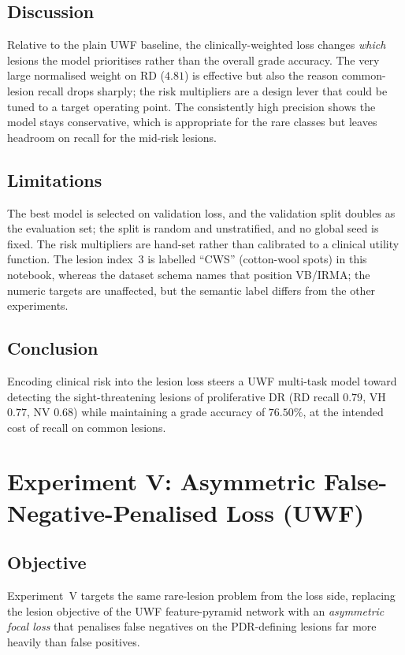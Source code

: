 \documentclass[journal,twoside,web]{ieeecolor}
\begin{document}
\subsection{Discussion}
Relative to the plain UWF baseline, the clinically-weighted loss changes
\emph{which} lesions the model prioritises rather than the overall grade accuracy.
The very large normalised weight on RD ($4.81$) is effective but also the reason
common-lesion recall drops sharply; the risk multipliers are a design lever that
could be tuned to a target operating point. The consistently high precision shows
the model stays conservative, which is appropriate for the rare classes but leaves
headroom on recall for the mid-risk lesions.

\subsection{Limitations}
The best model is selected on validation loss, and the validation split doubles as
the evaluation set; the split is random and unstratified, and no global seed is
fixed. The risk multipliers are hand-set rather than calibrated to a clinical
utility function. The lesion index~$3$ is labelled ``CWS'' (cotton-wool spots) in
this notebook, whereas the dataset schema names that position VB/IRMA; the numeric
targets are unaffected, but the semantic label differs from the other experiments.

\subsection{Conclusion}
Encoding clinical risk into the lesion loss steers a UWF multi-task model toward
detecting the sight-threatening lesions of proliferative DR (RD recall $0.79$,
VH $0.77$, NV $0.68$) while maintaining a grade accuracy of $76.50\%$, at the
intended cost of recall on common lesions.

\section{Experiment V: Asymmetric False-Negative-Penalised Loss (UWF)}
\label{sec:exp5}

\subsection{Objective}
Experiment~V targets the same rare-lesion problem from the loss side, replacing the
lesion objective of the UWF feature-pyramid network with an \emph{asymmetric focal
loss} that penalises false negatives on the PDR-defining lesions far more heavily
than false positives.
\end{document}
